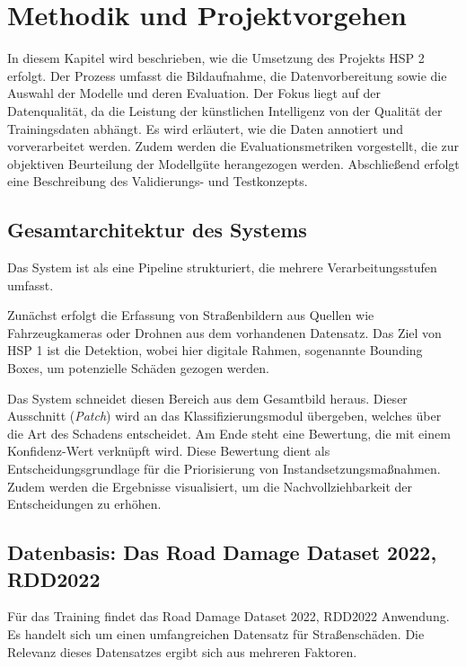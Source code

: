 \section{Methodik und Projektvorgehen}
\label{sec:methodik}

In diesem Kapitel wird beschrieben, wie die Umsetzung des Projekts HSP 2 erfolgt. Der Prozess umfasst die Bildaufnahme, die Datenvorbereitung sowie die Auswahl der Modelle und deren Evaluation. Der Fokus liegt auf der Datenqualität, da die Leistung der künstlichen Intelligenz von der Qualität der Trainingsdaten abhängt. Es wird erläutert, wie die Daten annotiert und vorverarbeitet werden. Zudem werden die Evaluationsmetriken vorgestellt, die zur objektiven Beurteilung der Modellgüte herangezogen werden. Abschließend erfolgt eine Beschreibung des Validierungs- und Testkonzepts.

\subsection{Gesamtarchitektur des Systems}
\label{subsec:architektur}

Das System ist als eine Pipeline strukturiert, die mehrere Verarbeitungsstufen umfasst.

Zunächst erfolgt die Erfassung von Straßenbildern aus Quellen wie Fahrzeugkameras oder Drohnen aus dem vorhandenen Datensatz. Das Ziel von HSP 1 ist die Detektion, wobei hier digitale Rahmen, sogenannte Bounding Boxes, um potenzielle Schäden gezogen werden.

Das System schneidet diesen Bereich aus dem Gesamtbild heraus. Dieser Ausschnitt (\emph{Patch}) wird an das Klassifizierungsmodul übergeben, welches über die Art des Schadens entscheidet. Am Ende steht eine Bewertung, die mit einem Konfidenz-Wert verknüpft wird. Diese Bewertung dient als Entscheidungsgrundlage für die Priorisierung von Instandsetzungsmaßnahmen. Zudem werden die Ergebnisse visualisiert, um die Nachvollziehbarkeit der Entscheidungen zu erhöhen.

\subsection{Datenbasis: Das Road Damage Dataset 2022, RDD2022}
\label{subsec:rdd2022}

Für das Training findet das Road Damage Dataset 2022, RDD2022 Anwendung. Es handelt sich um einen umfangreichen Datensatz für Straßenschäden. Die Relevanz dieses Datensatzes ergibt sich aus mehreren Faktoren.

